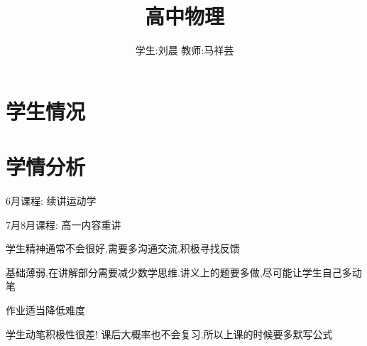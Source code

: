 \documentclass{article}
\title{高中物理}
\author{学生:\quad 刘晨 \quad 教师:\quad 马祥芸}
\begin{document}
    \maketitle
    \tableofcontents
    \newpage

    \section{学生情况}
    \begin{center}
    \end{center}
        
    \section{学情分析}
    6月课程:
    续讲运动学

    7月8月课程:
    高一内容重讲

    学生精神通常不会很好,需要多沟通交流,积极寻找反馈

    基础薄弱,在讲解部分需要减少数学思维.讲义上的题要多做,尽可能让学生自己多动笔

    作业适当降低难度

    学生动笔积极性很差! 课后大概率也不会复习,所以上课的时候要多默写公式
\end{document}
